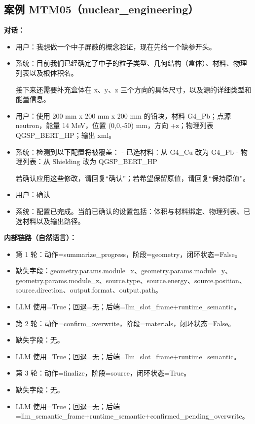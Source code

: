 \documentclass[11pt]{ctexart}
\begin{document}
\subsection{案例 MTM05（nuclear\_engineering）}
\textbf{对话：}
\begin{itemize}
\item 用户：我想做一个中子屏蔽的概念验证，现在先给一个缺参开头。
\item 系统：目前我们已经确定了中子的粒子类型、几何结构（盒体）、材料、物理列表以及根体积名。

接下来还需要补充盒体在 x、y、z 三个方向的具体尺寸，以及源的详细类型和能量信息。
\item 用户：使用 200 mm x 200 mm x 200 mm 的铅块，材料 G4\_Pb；点源 neutron，能量 14 MeV，位置 (0,0,-50) mm，方向 +z；物理列表 QGSP\_BERT\_HP；输出 xml。
\item 系统：检测到以下配置将被覆盖：
- 已选材料：从 G4\_Cu 改为 G4\_Pb
- 物理列表：从 Shielding 改为 QGSP\_BERT\_HP

若确认应用这些修改，请回复“确认”；若希望保留原值，请回复“保持原值”。
\item 用户：确认
\item 系统：配置已完成。当前已确认的设置包括：体积与材料绑定、物理列表、已选材料以及输出路径。
\end{itemize}
\textbf{内部链路（自然语言）：}
\begin{itemize}
\item 第 1 轮：动作=summarize\_progress，阶段=geometry，闭环状态=False。
\item 缺失字段：geometry.params.module\_x、geometry.params.module\_y、geometry.params.module\_z、source.type、source.energy、source.position、source.direction、output.format、output.path。
\item LLM 使用=True；回退=无；后端=llm\_slot\_frame+runtime\_semantic。
\item 第 2 轮：动作=confirm\_overwrite，阶段=materials，闭环状态=False。
\item 缺失字段：无。
\item LLM 使用=True；回退=无；后端=llm\_slot\_frame+runtime\_semantic。
\item 第 3 轮：动作=finalize，阶段=source，闭环状态=True。
\item 缺失字段：无。
\item LLM 使用=True；回退=无；后端=llm\_semantic\_frame+runtime\_semantic+confirmed\_pending\_overwrite。
\end{itemize}
\end{document}
